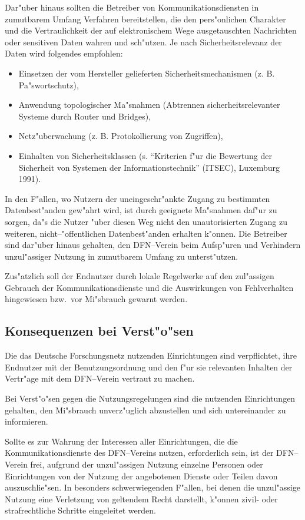 \documentclass[12pt,titlepage,twoside]{scrartcl}
\begin{document}
\begin{appendix}
Dar"uber hinaus sollten die Betreiber von Kommunikationsdiensten in
zumutbarem Umfang Verfahren bereitstellen, die den pers"onlichen Charakter
und die Vertraulichkeit der auf elektronischem Wege ausgetauschten
Nachrichten oder sensitiven Daten wahren und sch"utzen. Je nach
Sicherheitsrelevanz der Daten wird folgendes empfohlen:

\begin{itemize}
  \item Einsetzen der vom Hersteller gelieferten Sicherheitsmechanismen (z. B.
    Pa"swortschutz),
  \item Anwendung topologischer Ma"snahmen (Abtrennen sicherheitsrelevanter
    Systeme durch Router und Bridges),
  \item Netz"uberwachung (z. B. Protokollierung von Zugriffen),
  \item Einhalten von Sicherheitsklassen (s. "`Kriterien f"ur die Bewertung der
    Sicherheit von Systemen der Informationstechnik"' (ITSEC), Luxemburg
    1991).
\end{itemize}

In den F"allen, wo Nutzern der uneingeschr"ankte Zugang zu bestimmten
Datenbest"anden gew"ahrt wird, ist durch geeignete Ma"snahmen daf"ur zu sorgen,
da"s die Nutzer "uber diesen Weg nicht den unautorisierten Zugang zu
weiteren, nicht--"offentlichen Datenbest"anden erhalten k"onnen. Die Betreiber
sind dar"uber hinaus gehalten, den DFN--Verein beim Aufsp"uren und Verhindern
unzul"assiger Nutzung in zumutbarem Umfang zu unterst"utzen.

Zus"atzlich soll der Endnutzer durch lokale Regelwerke auf den zul"assigen
Gebrauch der Kommunikationsdienste und die Auswirkungen von Fehlverhalten
hingewiesen bzw.\  vor Mi"sbrauch gewarnt werden.

\subsection{Konsequenzen bei Verst"o"sen}

Die das Deutsche Forschungsnetz nutzenden Einrichtungen sind verpflichtet,
ihre Endnutzer mit der Benutzungsordnung und den f"ur sie relevanten Inhalten
der Vertr"age mit dem DFN--Verein vertraut zu machen.

Bei Verst"o"sen gegen die Nutzungsregelungen sind die nutzenden Einrichtungen
gehalten, den Mi"sbrauch unverz"uglich abzustellen und sich untereinander zu
informieren.

Sollte es zur Wahrung der Interessen aller Einrichtungen, die die
Kommunikationsdienste des DFN--Vereins nutzen, erforderlich sein, ist der
DFN--Verein frei, aufgrund der unzul"assigen Nutzung einzelne Personen oder
Einrichtungen von der Nutzung der angebotenen Dienste oder Teilen davon
auszuschlie"sen. In besonders schwerwiegenden F"allen, bei denen die
unzul"assige Nutzung eine Verletzung von geltendem Recht darstellt, k"onnen
zivil- oder strafrechtliche Schritte eingeleitet werden.


\end{appendix}
\end{document}
